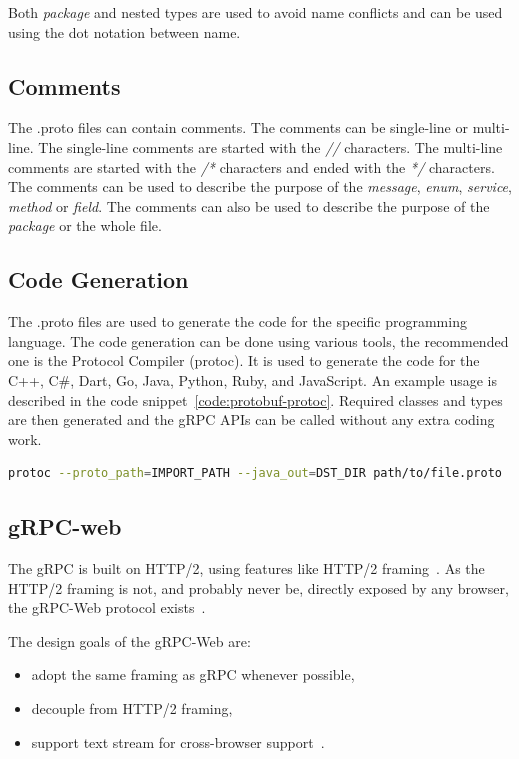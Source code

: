 Both \textit{package} and nested types are used to avoid name conflicts and can be used using the dot notation between name.

\subsection{Comments}
The .proto files can contain comments.
The comments can be single-line or multi-line.
The single-line comments are started with the \textit{//} characters.
The multi-line comments are started with the \textit{/*} characters and ended with the \textit{*/} characters.
The comments can be used to describe the purpose of the \textit{message}, \textit{enum}, \textit{service}, \textit{method} or \textit{field}.
The comments can also be used to describe the purpose of the \textit{package} or the whole file.
\cite{protobuf-proto3}

\subsection{Code Generation}
The .proto files are used to generate the code for the specific programming language.
The code generation can be done using various tools, the recommended one is the Protocol Compiler (protoc).
It is used to generate the code for the C++, C\#, Dart, Go, Java, Python, Ruby, and JavaScript.
An example usage is described in the code snippet~\ref{code:protobuf-protoc}.
Required classes and types are then generated and the gRPC APIs can be called without any extra coding work.
\cite{protobuf-proto3}

\begin{lstlisting}[language=bash, caption={Protocol Buffers Code Generation~\cite{protobuf-proto3}}, label={code:protobuf-protoc}]
protoc --proto_path=IMPORT_PATH --java_out=DST_DIR path/to/file.proto
\end{lstlisting}

\subsection{gRPC-web}
The gRPC is built on HTTP/2, using features like HTTP/2 framing~\cite{grpc-protocol-http2}.
As the HTTP/2 framing is not, and probably never be, directly exposed by any browser, the gRPC-Web protocol exists~\cite{grpc-protocol-web}.

The design goals of the gRPC-Web are:
\begin{itemize}
    \item adopt the same framing as gRPC whenever possible,
    \item decouple from HTTP/2 framing,
    \item support text stream for cross-browser support~\cite{grpc-protocol-web}.
\end{itemize}

